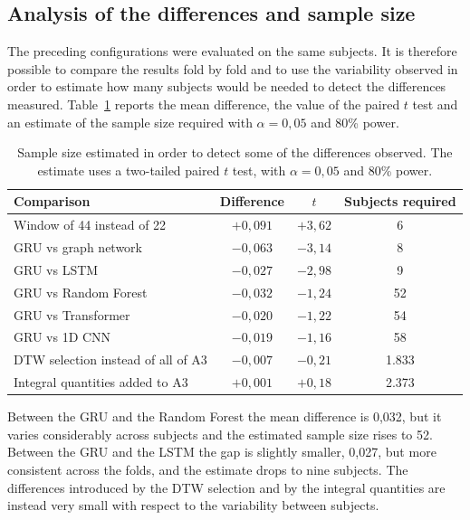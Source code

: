 \subsection{Analysis of the differences and sample size}

The preceding configurations were evaluated on the same subjects. It is therefore possible to compare the results fold by fold and to use the variability observed in order to estimate how many subjects would be needed to detect the differences measured. Table~\ref{tab:numerosita} reports the mean difference, the value of the paired $t$ test and an estimate of the sample size required with $\alpha=0{,}05$ and 80\% power.

\begin{table}[htbp]
\centering
\caption{Sample size estimated in order to detect some of the differences observed.
The estimate uses a two-tailed paired $t$ test, with $\alpha=0{,}05$ and
80\% power.}
\label{tab:numerosita}
\begin{tabular}{lccc}
\toprule
\textbf{Comparison} &
\textbf{Difference} &
\textbf{$t$} &
\textbf{Subjects required} \\
\midrule
Window of 44 instead of 22 & $+0{,}091$ & $+3{,}62$ & 6 \\
GRU vs graph network & $-0{,}063$ & $-3{,}14$ & 8 \\
GRU vs LSTM & $-0{,}027$ & $-2{,}98$ & 9 \\
GRU vs Random Forest & $-0{,}032$ & $-1{,}24$ & 52 \\
GRU vs Transformer & $-0{,}020$ & $-1{,}22$ & 54 \\
GRU vs 1D CNN & $-0{,}019$ & $-1{,}16$ & 58 \\
DTW selection instead of all of A3 & $-0{,}007$ & $-0{,}21$ & 1.833 \\
Integral quantities added to A3 & $+0{,}001$ & $+0{,}18$ & 2.373 \\
\bottomrule
\end{tabular}
\end{table}

Between the GRU and the Random Forest the mean difference is 0,032, but it varies considerably across subjects and the estimated sample size rises to 52. Between the GRU and the LSTM the gap is slightly smaller, 0,027, but more consistent across the folds, and the estimate drops to nine subjects. The differences introduced by the DTW selection and by the integral quantities are instead very small with respect to the variability between subjects.

